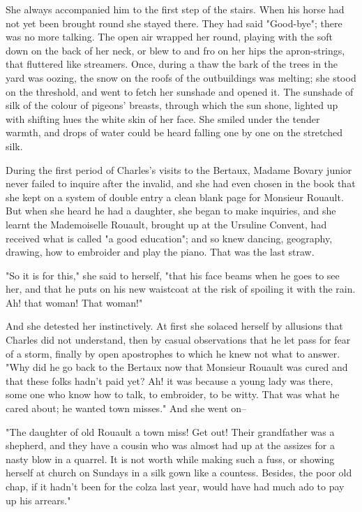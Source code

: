 \documentclass{tufte-book}
\begin{document}
She always accompanied him to the first step of the stairs. When his
horse had not yet been brought round she stayed there. They had said
"Good-bye"; there was no more talking. The open air wrapped her round,
playing with the soft down on the back of her neck, or blew to and fro
on her hips the apron-strings, that fluttered like streamers. Once,
during a thaw the bark of the trees in the yard was oozing, the snow on
the roofs of the outbuildings was melting; she stood on the threshold,
and went to fetch her sunshade and opened it. The sunshade of silk of
the colour of pigeons' breasts, through which the sun shone, lighted
up with shifting hues the white skin of her face. She smiled under the
tender warmth, and drops of water could be heard falling one by one on
the stretched silk.

During the first period of Charles's visits to the Bertaux, Madame
Bovary junior never failed to inquire after the invalid, and she had
even chosen in the book that she kept on a system of double entry a
clean blank page for Monsieur Rouault. But when she heard he had a
daughter, she began to make inquiries, and she learnt the Mademoiselle
Rouault, brought up at the Ursuline Convent, had received what is called
"a good education"; and so knew dancing, geography, drawing, how to
embroider and play the piano. That was the last straw.

"So it is for this," she said to herself, "that his face beams when he
goes to see her, and that he puts on his new waistcoat at the risk of
spoiling it with the rain. Ah! that woman! That woman!"

And she detested her instinctively. At first she solaced herself by
allusions that Charles did not understand, then by casual observations
that he let pass for fear of a storm, finally by open apostrophes to
which he knew not what to answer. "Why did he go back to the Bertaux now
that Monsieur Rouault was cured and that these folks hadn't paid yet?
Ah! it was because a young lady was there, some one who know how to
talk, to embroider, to be witty. That was what he cared about; he wanted
town misses." And she went on--

"The daughter of old Rouault a town miss! Get out! Their grandfather was
a shepherd, and they have a cousin who was almost had up at the assizes
for a nasty blow in a quarrel. It is not worth while making such a fuss,
or showing herself at church on Sundays in a silk gown like a countess.
Besides, the poor old chap, if it hadn't been for the colza last year,
would have had much ado to pay up his arrears."
\end{document}
